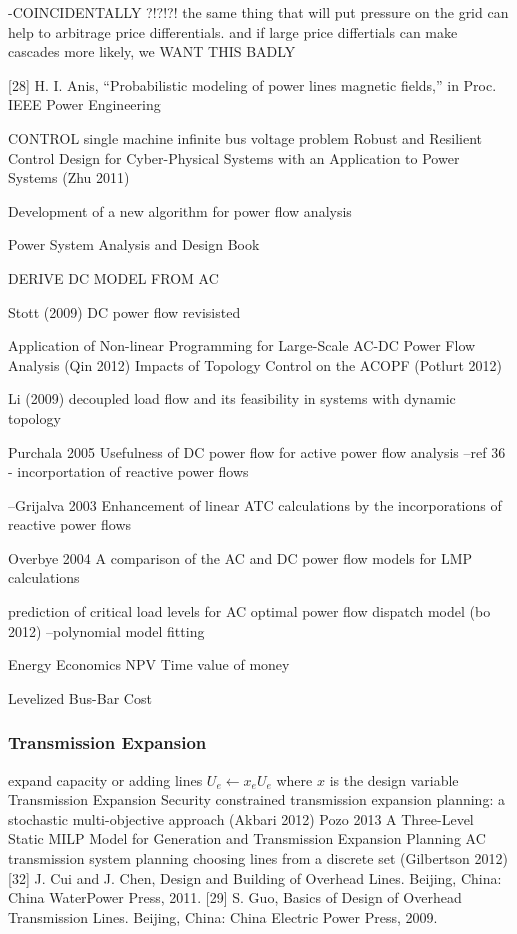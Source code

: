 -COINCIDENTALLY ?!?!?! the same thing that will put pressure on the grid can help to arbitrage price differentials.  and if large price differtials can make cascades more likely, we WANT THIS BADLY


[28] H. I. Anis, “Probabilistic modeling of power lines magnetic fields,” in
Proc. IEEE Power Engineering


CONTROL
single machine infinite bus voltage problem
Robust and Resilient Control Design for Cyber-Physical Systems with an Application to Power Systems (Zhu 2011) \cite{zhu_2011}




Development of a new algorithm for power flow analysis \cite{mallick_2011}


Power System Analysis and Design Book \cite{glover_2008}


DERIVE DC MODEL FROM AC 

Stott (2009) DC power flow revisisted \cite{stott_2009}

Application of Non-linear Programming for Large-Scale AC-DC Power Flow Analysis (Qin 2012) \cite{qin_2012}
Impacts of Topology Control on the ACOPF (Potlurt 2012) \cite{potluri_2012}

Li (2009) decoupled load flow and its feasibility in systems with dynamic topology \cite{li_2009}

Purchala 2005 Usefulness of DC power flow for active power flow analysis 
--ref 36 - incorportation of reactive power flows

--Grijalva 2003 Enhancement of linear ATC calculations by the incorporations of reactive power flows

Overbye 2004 A comparison of the AC and DC power flow models for LMP calculations

prediction of critical load levels for AC optimal power flow dispatch model (bo 2012) \cite{bo_2012}
--polynomial model fitting


Energy Economics
NPV
Time value of money

Levelized Bus-Bar Cost


\subsubsection{Transmission Expansion}
expand capacity or adding lines
$U_e \leftarrow x_e U_e $
where $x$ is the design variable
Transmission Expansion
Security constrained transmission expansion planning: a stochastic multi-objective approach (Akbari 2012) \cite{akbari_2012}
Pozo 2013 A Three-Level Static MILP Model for Generation and Transmission Expansion Planning
AC transmission system planning choosing lines from a discrete set (Gilbertson 2012) \cite{gilbertson_2012}
[32] J. Cui and J. Chen, Design and Building of Overhead Lines. Beijing,
China: China WaterPower Press, 2011.
[29] S. Guo, Basics of Design of Overhead Transmission Lines. Beijing,
China: China Electric Power Press, 2009.



